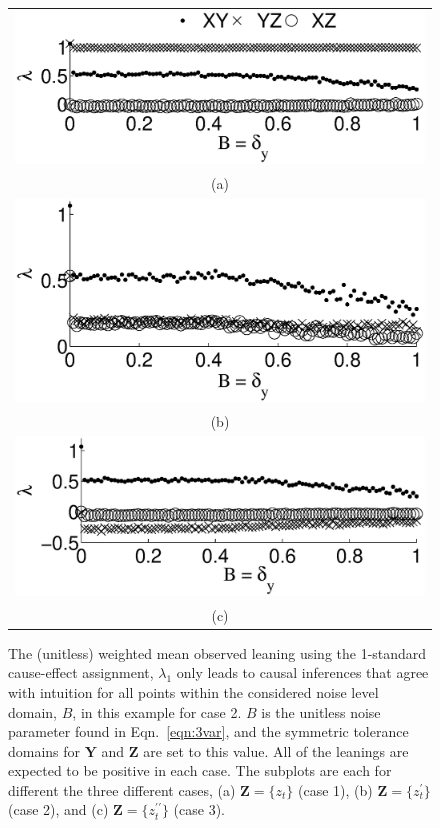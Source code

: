\documentclass[twocolumn,aps,pre,groupedaddress]{revtex4-1}
\begin{document}
\begin{figure}[ht]
\begin{tabular}{c}
\includegraphics[scale=0.45]{XYZIRexample_Bxytol.eps} \\ 
(a) \\
\includegraphics[scale=0.45]{XYZIRexample_BxytolZXandY.eps} \\
(b) \\
\includegraphics[scale=0.45]{XYZIRexample_BxytolZXandYandZ.eps} \\
(c) \\
\end{tabular}
\caption{The (unitless) weighted mean observed leaning using the 1-standard cause-effect assignment, $\lambda_1$ only leads to causal inferences that agree with intuition for all points within the considered noise level domain, $B$, in this example for case 2.  $B$ is the unitless noise parameter found in Eqn.\ \ref{eqn:3var}, and the symmetric tolerance domains for $\mathbf{Y}$ and $\mathbf{Z}$ are set to this value.  All of the leanings are expected to be positive in each case.  The subplots are each for different the three different cases, (a) $\mathbf{Z} = \{z_t\}$ (case 1), (b) $\mathbf{Z} = \{z^\prime_t\}$ (case 2), and (c) $\mathbf{Z} = \{z^{\prime\prime}_t\}$ (case 3).}
\label{fig:3var}
\end{figure}
\end{document}
